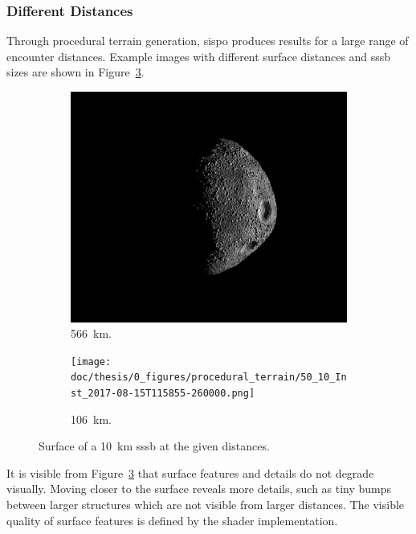 \subsubsection{Different Distances}
Through procedural terrain generation, \gls{sispo} produces results for a large range of encounter distances. Example images with different surface distances and \gls{sssb} sizes are shown in Figure~\ref{fig:img_procedural_10k}.

\begin{figure}[htb]
    \centering
        \begin{subfigure}[b]{0.49\textwidth}
            \centering
            \includegraphics[width=\textwidth]{doc/thesis/0_figures/procedural_terrain/50_10_Inst_2017-08-15T115755-845000.png}
            \caption{\SI{566}{\kilo\meter}.}
            \label{fig:img_procedural_500}
        \end{subfigure}
        \begin{subfigure}[b]{0.49\textwidth}
            \centering
            \texttt{[image: doc/thesis/0\_figures/procedural\_terrain/50\_10\_Inst\_2017-08-15T115855-260000.png]}
            \caption{\SI{106}{\kilo\meter}.}
            \label{fig:img_procedural_100}
        \end{subfigure}
    \caption{Surface of a \SI{10}{\kilo\meter} \gls{sssb} at the given distances.}
    \label{fig:img_procedural_10k}
\end{figure}

It is visible from Figure~\ref{fig:img_procedural_10k} that surface features and details do not degrade visually. Moving closer to the surface reveals more details, such as tiny bumps between larger structures which are not visible from larger distances. The visible quality of surface features is defined by the shader implementation. 

